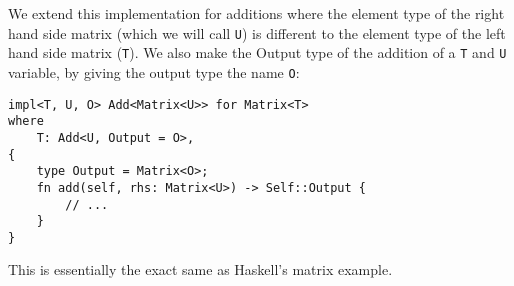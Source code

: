 We extend this implementation for additions where the element type of the right hand side matrix (which we will call \verb|U|) is different to the element type of the left hand side matrix (\verb|T|). We also make the Output type of the addition of a \verb|T| and \verb|U| variable, by giving the output type the name \verb|O|:
\begin{verbatim}
impl<T, U, O> Add<Matrix<U>> for Matrix<T>
where
    T: Add<U, Output = O>,
{
    type Output = Matrix<O>;
    fn add(self, rhs: Matrix<U>) -> Self::Output {
        // ...
    }
}
\end{verbatim}
This is essentially the exact same as Haskell's matrix example.







